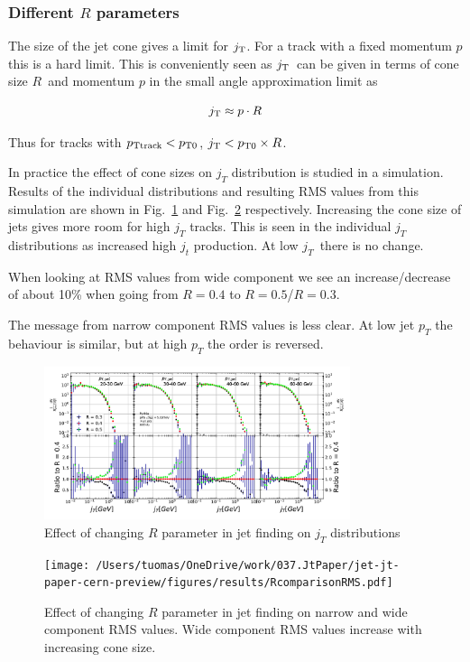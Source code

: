 \subsubsection{Different $R$ parameters}
\label{sec:Rstudy}
The size of the jet cone gives a limit for $j_{\rm T}$. For a track with a fixed momentum $p$ this is a hard limit. This is conveniently seen as $j_{\rm T}$ can be given in terms of cone size $R$ and momentum $p$ in the small angle approximation limit as

\begin{equation}
j_{\rm T} \approx p \cdot R
\end{equation}

Thus for tracks with $p_{\rm Ttrack} < p_{\rm T0} $, $j_{\rm T} < p_{\rm T0} \times R$.
 

In practice the effect of cone sizes on $j_T$ distribution is studied in a \pythia simulation. Results of the individual distributions and resulting RMS values from this simulation are shown in Fig.~\ref{fig:RcomparisonjT} and Fig.~\ref{fig:RcomparisonRMS} respectively. Increasing the cone size of jets gives more room for high $j_T$ tracks. This is seen in the individual $j_T$ distributions as increased high $j_t$ production. At low $j_T$ there is no change.

When looking at RMS values from wide component we see an increase/decrease of about 10\% when going from $R=0.4$ to $R=0.5$/$R=0.3$.

The message from narrow component RMS values is less clear. At low jet $p_T$ the behaviour is similar, but at high $p_T$ the order is reversed.
\begin{figure}[htp]
\centering
\includegraphics[width=0.8\textwidth]{results/RcomparisonSignal.pdf}
\caption[Pythia $R$ parameters $j_T$]{Effect of changing $R$ parameter in jet finding on $j_T$ distributions}
\label{fig:RcomparisonjT}
\end{figure}


\begin{figure}[htp]
\centering
\texttt{[image: /Users/tuomas/OneDrive/work/037.JtPaper/jet-jt-paper-cern-preview/figures/results/RcomparisonRMS.pdf]} \\
\caption[Pythia $R$ parameters RMS]{Effect of changing $R$ parameter in jet finding on narrow and wide component RMS values. Wide component RMS values increase with increasing cone size.}
\label{fig:RcomparisonRMS}
\end{figure}


